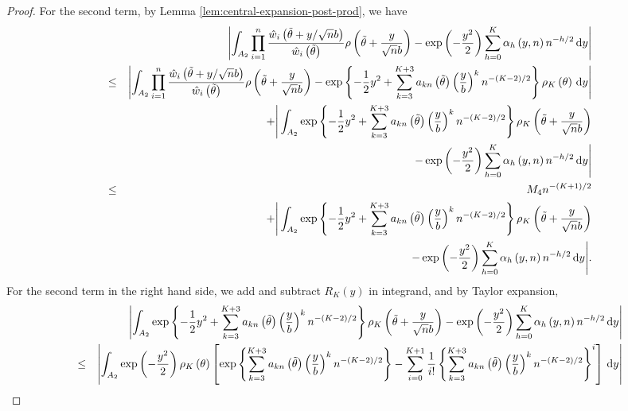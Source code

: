 \begin{proof}
For the second term, by Lemma \ref{lem:central-expansion-post-prod},
we have 
\begin{eqnarray*}
 &  & \left|\int_{A_{2}}\prod_{i=1}^{n}\frac{\hat{w}_{i}\left(\tilde{\theta}+y/\sqrt{n}b\right)}{\hat{w}_{i}\left(\tilde{\theta}\right)}\rho\left(\tilde{\theta}+\frac{y}{\sqrt{n}b}\right)-\exp\left(-\frac{y^{2}}{2}\right)\sum_{h=0}^{K}\alpha_{h}\left(y,n\right)n^{-h/2}\,\mathrm{d} y\right|\\
 & \le & \left|\int_{A_{2}}\prod_{i=1}^{n}\frac{\hat{w}_{i}\left(\tilde{\theta}+y/\sqrt{n}b\right)}{\hat{w}_{i}\left(\tilde{\theta}\right)}\rho\left(\tilde{\theta}+\frac{y}{\sqrt{n}b}\right)-\exp\left\{ -\frac{1}{2}y^{2}+\sum_{k=3}^{K+3}a_{kn}\left(\tilde{\theta}\right)\left(\frac{y}{b}\right)^{k}n^{-\left(K-2\right)/2}\right\} \rho_{K}\left(\theta\right)\,\mathrm{d} y\right|\\
 &  & +\Bigg|\int_{A_{2}}\exp\left\{ -\frac{1}{2}y^{2}+\sum_{k=3}^{K+3}a_{kn}\left(\tilde{\theta}\right)\left(\frac{y}{b}\right)^{k}n^{-\left(K-2\right)/2}\right\} \rho_{K}\left(\tilde{\theta}+\frac{y}{\sqrt{n}b}\right)\\
 & & -\exp\left(-\frac{y^{2}}{2}\right)\sum_{h=0}^{K}\alpha_{h}\left(y,n\right)n^{-h/2}\,\mathrm{d} y\Bigg|\\
 & \le & M_{4}n^{-\left(K+1\right)/2}\\
 &  & +\Bigg|\int_{A_{2}}\exp\left\{ -\frac{1}{2}y^{2}+\sum_{k=3}^{K+3}a_{kn}\left(\tilde{\theta}\right)\left(\frac{y}{b}\right)^{k}n^{-\left(K-2\right)/2}\right\} \rho_{K}\left(\tilde{\theta}+\frac{y}{\sqrt{n}b}\right)\\
 & &-\exp\left(-\frac{y^{2}}{2}\right)\sum_{h=0}^{K}\alpha_{h}\left(y,n\right)n^{-h/2}\,\mathrm{d} y\Bigg|.
\end{eqnarray*}
For the second term in the right hand side, we add and subtract $R_{K}\left(y\right)$
in integrand, and by Taylor expansion, 
\begin{eqnarray*}
 &  & \left|\int_{A_{2}}\exp\left\{ -\frac{1}{2}y^{2}+\sum_{k=3}^{K+3}a_{kn}\left(\tilde{\theta}\right)\left(\frac{y}{b}\right)^{k}n^{-\left(K-2\right)/2}\right\} \rho_{K}\left(\tilde{\theta}+\frac{y}{\sqrt{n}b}\right)-\exp\left(-\frac{y^{2}}{2}\right)\sum_{h=0}^{K}\alpha_{h}\left(y,n\right)n^{-h/2}\diff y\right|\\
 & \le & \left|\int_{A_{2}}\exp\left(-\frac{y^{2}}{2}\right)\rho_{K}\left(\theta\right)\left[\exp\left\{ \sum_{k=3}^{K+3}a_{kn}\left(\tilde{\theta}\right)\left(\frac{y}{b}\right)^{k}n^{-\left(K-2\right)/2}\right\} -\sum_{i=0}^{K+1}\frac{1}{i!}\left\{ \sum_{k=3}^{K+3}a_{kn}\left(\tilde{\theta}\right)\left(\frac{y}{b}\right)^{k}n^{-\left(K-2\right)/2}\right\} ^{i}\right]\diff y\right|\\

\end{eqnarray*}
\end{proof}
